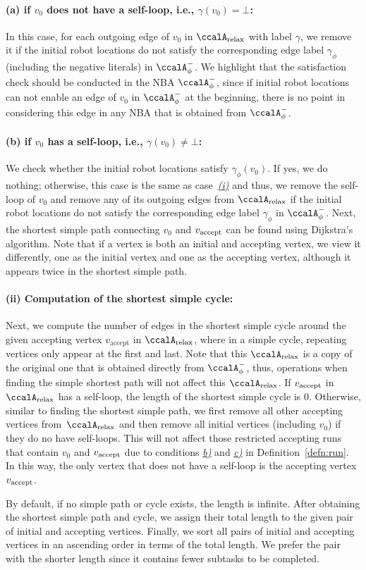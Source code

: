 \documentclass[Afour,sageh,times]{sagej}
\newcommand{\auto}[1]{\ccalA_{\textup{#1}}}
\newcommand{\autop}{\ccalA_{\phi}}
\newcommand{\vertex}[1]{v_{\textup{#1}}}
\begin{document}
{\paragraph{\quad (a) if $v_0$ does not have a self-loop, i.e., $\gamma(v_0)=\bot$:}\label{sec:initial} In this case, for each outgoing edge of $v_0$ in $\auto{relax}$ with label $\gamma$,  we remove it  if the initial robot locations do not satisfy the corresponding edge label $\gamma_\phi$ (including the negative literals) in $\autop^-$. We highlight that the satisfaction check should be conducted in the NBA $\autop^-$, since if initial robot locations can not enable an edge of $v_0$ in $\autop^-$ at the beginning, there is no point in considering this edge in any NBA that is obtained from $\autop^-$.
\paragraph{\quad (b) if $v_0$ has a self-loop, i.e., $\gamma(v_0)\neq\bot$:} We check whether the initial robot locations satisfy $\gamma_\phi(v_0)$. If yes, we do nothing; otherwise, this case is the  same as case~\hyperref[sec:initial]{\it (i)} and thus, we remove the self-loop of $v_0$ and
remove any of its  outgoing edges  from $\auto{relax}$ if the initial robot locations do not satisfy the corresponding edge label $\gamma_\phi$ in $\autop^-$. Next, the shortest simple path connecting $v_0$ and $\vertex{accept}$ can be found using Dijkstra's algorithm.  Note that if a vertex is both an initial and accepting vertex, we view it differently, one as the initial vertex and one as the accepting vertex, although it appears twice in the shortest simple path.
\paragraph{(ii) Computation of the shortest simple cycle:} Next, we compute the number of edges in the shortest simple cycle around the given accepting vertex $v_\text{accept}$ in $\auto{relax}$, where in a simple cycle, repeating vertices only appear at the first and last. Note that this $\auto{relax}$ is a copy of the original one that is obtained directly from $\autop^-$, thus, operations when finding the simple shortest path will not affect this $\auto{relax}$. If $\vertex{accept}$ in $\auto{relax}$ has a self-loop, the length of the shortest simple cycle is 0. Otherwise, similar to finding the shortest simple path, we first remove all other accepting vertices from~$\auto{relax}$ and then remove all initial vertices (including $v_0$) if they do no have self-loops. This will not affect those restricted accepting runs that contain $v_0$ and $\vertex{accept}$  due to conditions \hyperref[cond:b]{\it b)} and \hyperref[cond:c]{\it c)} in Definition~\ref{defn:run}.
  In this way, the only vertex that does not have a self-loop is the accepting vertex $\vertex{accept}$.

  By default, if no simple path or cycle exists, the length is infinite. After obtaining the shortest simple path and cycle, we assign their total length to the given pair of initial and accepting vertices.  Finally,  we sort all pairs of initial and accepting vertices in an ascending order in terms of the total length. We prefer the pair with the shorter length since it contains fewer subtasks to be completed.}
\end{document}

